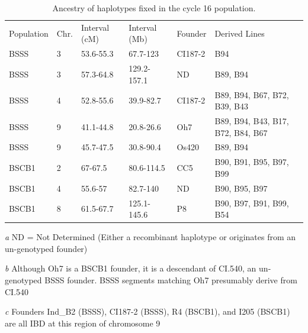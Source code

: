 \documentclass[twocolumn,twoside,letterpaper]{article}
\begin{document}
\begin{table}[t]
\caption{Ancestry of haplotypes fixed in the cycle 16 population.}
\fontsize{10}{12}\sf
\centering
   \begin{threeparttable}

\label{tab:fix}
\begin{tabular}{llllll}
Population &	 Chr.& Interval (cM) & Interval (Mb) &	Founder & Derived Lines \\
BSSS       & 3          & 53.6-55.3            & 67.7-123              & CI187-2        & B94                               \\
BSSS       & 3          & 57.3-64.8              & 129.2-157.1           & ND\tnote{\emph{a}}           & B89, B94                          \\
BSSS       & 4          & 52.8-55.6            & 39.9-82.7             & CI187-2        & B89, B94, B67, B72, B39, B43      \\
BSSS       & 9          & 41.1-44.8            & 20.8-26.6             & Oh7\tnote{\emph{b}}           & B89, B94, B43, B17, B72, B84, B67 \\
BSSS       & 9          & 45.7-47.5\tnote{\emph{c}}           & 30.8-90.4             & Os420          & B89, B94                          \\
BSCB1      & 2          & 67-67.5            & 80.6-114.5            & CC5            & B90, B91, B95, B97, B99           \\
BSCB1      & 4          & 55.6-57            & 82.7-140              & ND\tnote{\emph{a}}            & B90, B95, B97                     \\
BSCB1      & 8          & 61.5-67.7            & 125.1-145.6           & P8             & B90, B97, B91, B99, B54           \\\hline 
\end{tabular}
   \begin{tablenotes}
      \footnotesize
      \item[\emph{a}]{ND = Not Determined (Either a recombinant haplotype or originates from an un-genotyped founder)}
      \item[\emph{b}]{Although Oh7 is a BSCB1 founder, it is a descendant of CI.540, an un-genotyped BSSS founder. BSSS segments matching Oh7 presumably derive from CI.540}            
      \item[\emph{c}]{Founders Ind\_B2 (BSSS), CI187-2 (BSSS), R4 (BSCB1), and I205 (BSCB1) are all IBD at this region of chromosome 9}
   \end{tablenotes}
\end{threeparttable}
\end{table}
\end{document}
